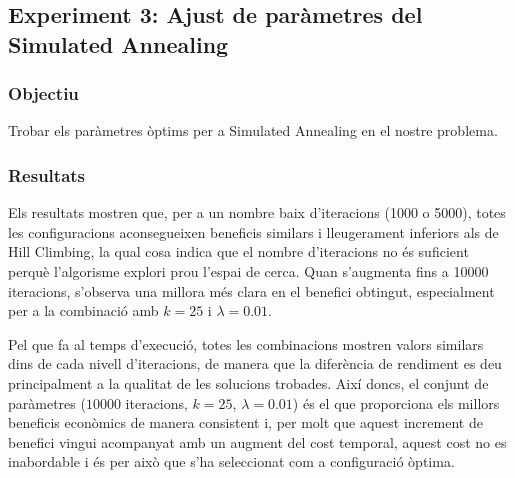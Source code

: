 
\subsection{Experiment 3: Ajust de paràmetres del Simulated Annealing}

\vspace{0.75cm}

\subsubsection{Objectiu}
Trobar els paràmetres òptims per a Simulated Annealing en el nostre problema.

\subsubsection{Resultats}

Els resultats mostren que, per a un nombre baix d’iteracions (1000 o 5000), totes les configuracions aconsegueixen beneficis similars i lleugerament inferiors als de Hill Climbing, la qual cosa indica que el nombre d’iteracions no és suficient perquè l’algorisme explori prou l’espai de cerca. Quan s’augmenta fins a 10000 iteracions, s’observa una millora més clara en el benefici obtingut, especialment per a la combinació amb $k = 25$ i $\lambda = 0.01$.

\vspace{0.5cm}



\vspace{0.5cm}



\vspace{0.5cm}



\vspace{0.5cm}

Pel que fa al temps d’execució, totes les combinacions mostren valors similars dins de cada nivell d’iteracions, de manera que la diferència de rendiment es deu principalment a la qualitat de les solucions trobades. Així doncs, el conjunt de paràmetres ($10000$ iteracions, $k = 25$, $\lambda = 0.01$) és el que proporciona els millors beneficis econòmics de manera consistent i, per molt que aquest increment de benefici vingui acompanyat amb un augment del cost temporal, aquest cost no es inabordable i és per això que s’ha seleccionat com a configuració òptima. 

\vspace{0.5cm}



\vspace{0.5cm}



\vspace{0.5cm}


